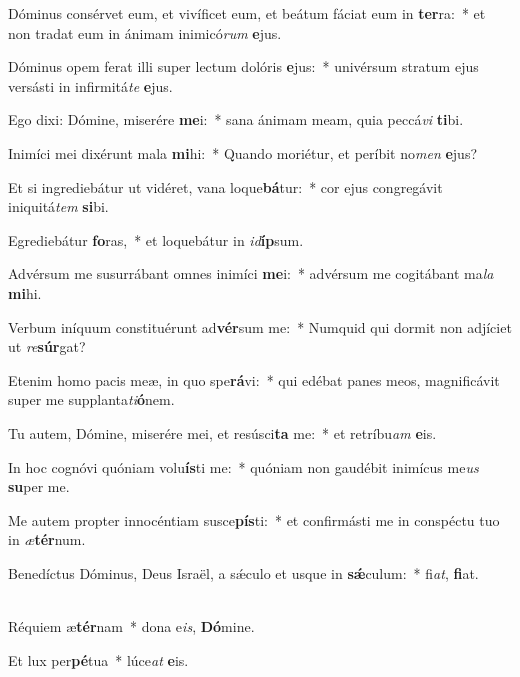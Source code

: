 \item Dóminus consérvet eum, et vivíficet eum, et beátum fáciat eum in \textbf{ter}ra:~* et non tradat eum in ánimam inimicó\textit{rum} \textbf{e}jus.

\item Dóminus opem ferat illi super lectum dolóris \textbf{e}jus:~* univérsum stratum ejus versásti in infirmitá\textit{te} \textbf{e}jus.

\item Ego dixi: Dómine, miserére \textbf{me}i:~* sana ánimam meam, quia peccá\textit{vi} \textbf{ti}bi.

\item Inimíci mei dixérunt mala \textbf{mi}hi:~* Quando moriétur, et períbit no\textit{men} \textbf{e}jus?

\item Et si ingrediebátur ut vidéret, vana loque\textbf{bá}tur:~* cor ejus congregávit iniquitá\textit{tem} \textbf{si}bi.

\item Egrediebátur \textbf{fo}ras,~* et loquebátur in \textit{id}\textbf{íp}sum.

\item Advérsum me susurrábant omnes inimíci \textbf{me}i:~* advérsum me cogitábant ma\textit{la} \textbf{mi}hi.

\item Verbum iníquum constituérunt ad\textbf{vér}sum me:~* Numquid qui dormit non adjíciet ut \textit{re}\textbf{súr}gat?

\item Etenim homo pacis meæ, in quo spe\textbf{rá}vi:~* qui edébat panes meos, magnificávit super me supplanta\textit{ti}\textbf{ó}nem.

\item Tu autem, Dómine, miserére mei, et resúsci\textbf{ta} me:~* et retríbu\textit{am} \textbf{e}is.

\item In hoc cognóvi quóniam volu\textbf{ís}ti me:~* quóniam non gaudébit inimícus me\textit{us} \textbf{su}per me.

\item Me autem propter innocéntiam susce\textbf{pís}ti:~* et confirmásti me in conspéctu tuo in \textit{æ}\textbf{tér}num.

\item Benedíctus Dóminus, Deus Israël, a sǽculo et usque in \textbf{sǽ}culum:~* fi\textit{at}, \textbf{fi}at.

\item ~\\Réquiem æ\textbf{tér}nam~* dona e\textit{is}, \textbf{Dó}mine.

\item Et lux per\textbf{pé}tua~* lúce\textit{at} \textbf{e}is.